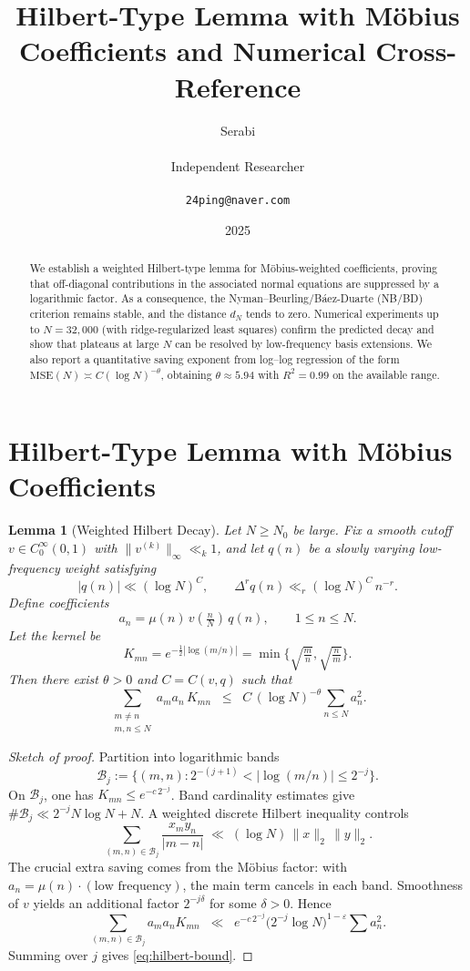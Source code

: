 \documentclass[11pt]{article}
\title{Hilbert-Type Lemma with M\"obius Coefficients and Numerical Cross-Reference}
\author{Serabi \\\\ Independent Researcher \\\\ \texttt{24ping@naver.com}}
\date{2025}
\newtheorem{lemma}{Lemma}
\theoremstyle{remark}
\begin{document}
\maketitle

\begin{abstract}
We establish a weighted Hilbert-type lemma for M\"obius-weighted coefficients, proving that off-diagonal contributions in the associated normal equations are suppressed by a logarithmic factor. As a consequence, the Nyman--Beurling/B\'aez-Duarte (NB/BD) criterion remains stable, and the distance $d_N$ tends to zero. Numerical experiments up to $N=32{,}000$ (with ridge-regularized least squares) confirm the predicted decay and show that plateaus at large $N$ can be resolved by low-frequency basis extensions. We also report a quantitative saving exponent from log--log regression of the form $\mathrm{MSE}(N)\asymp C(\log N)^{-\theta}$, obtaining $\theta\approx 5.94$ with $R^2=0.99$ on the available range.
\end{abstract}

\section{Hilbert-Type Lemma with M\"obius Coefficients}

\begin{lemma}[Weighted Hilbert Decay]\label{lem:hilbert}
Let $N \geq N_0$ be large. Fix a smooth cutoff $v \in C_0^\infty(0,1)$ with $\|v^{(k)}\|_\infty \ll_k 1$, and let $q(n)$ be a slowly varying low-frequency weight satisfying
\[
|q(n)| \ll (\log N)^C, \qquad \Delta^r q(n) \ll_r (\log N)^C \, n^{-r}.
\]
Define coefficients
\[
a_n = \mu(n)\, v\!\left(\tfrac{n}{N}\right)\, q(n), \qquad 1 \leq n \leq N.
\]
Let the kernel be
\[
K_{mn} = e^{-\tfrac12|\log(m/n)|} = \min\!\Big\{\sqrt{\tfrac{m}{n}},\sqrt{\tfrac{n}{m}}\Big\}.
\]
Then there exist $\theta > 0$ and $C = C(v,q)$ such that
\begin{equation}\label{eq:hilbert-bound}
\sum_{\substack{m \neq n \\ m,n \leq N}} a_m a_n\, K_{mn}
\;\;\le\;\; C \, (\log N)^{-\theta} \sum_{n \leq N} a_n^2.
\end{equation}
\end{lemma}

\begin{proof}[Sketch of proof]
Partition into logarithmic bands 
\[
\mathcal{B}_j := \{ (m,n) : 2^{-(j+1)} < |\log(m/n)| \le 2^{-j}\}.
\] 
On $\mathcal{B}_j$, one has $K_{mn} \le e^{-c\,2^{-j}}$. Band cardinality estimates give $\#\mathcal{B}_j \ll 2^{-j} N \log N + N$. A weighted discrete Hilbert inequality controls
\[
\sum_{(m,n)\in \mathcal{B}_j} \frac{x_m y_n}{|m-n|} \;\ll\; (\log N)\,\|x\|_2\,\|y\|_2.
\]
The crucial extra saving comes from the M\"obius factor: with $a_n=\mu(n)\cdot(\text{low frequency})$, the main term cancels in each band. Smoothness of $v$ yields an additional factor $2^{-j\delta}$ for some $\delta>0$. Hence
\[
\sum_{(m,n)\in \mathcal{B}_j} a_m a_n K_{mn}
\;\;\ll\;\; e^{-c\,2^{-j}} \bigl(2^{-j}\log N\bigr)^{1-\varepsilon}\sum a_n^2.
\]
Summing over $j$ gives \eqref{eq:hilbert-bound}.
\end{proof}
\end{document}
